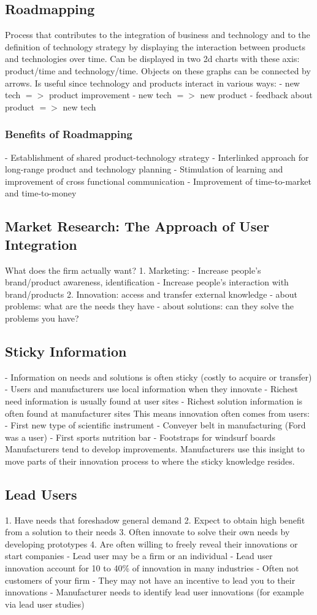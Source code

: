 \documentclass{scrartcl}
\begin{document}
\subsection*{Roadmapping}
Process that contributes to the integration of business and technology and to the definition of technology strategy by displaying the interaction between products and technologies over time.
Can be displayed in two 2d charts with these axis: product/time and technology/time.
Objects on these graphs can be connected by arrows.
Is useful since technology and products interact in various ways:
- new tech $=>$ product improvement
- new tech $=>$ new product
- feedback about product $=>$ new tech
\subsubsection*{Benefits of Roadmapping}
- Establishment of shared product-technology strategy
- Interlinked approach for long-range product and technology planning
- Stimulation of learning and improvement of cross functional communication
- Improvement of time-to-market and time-to-money
\subsection*{Market Research: The Approach of User Integration}
What does the firm actually want?
1. Marketing:
- Increase people's brand/product awareness, identification
- Increase people's interaction with brand/products
2. Innovation: access and transfer external knowledge
- about problems: what are the needs they have
- about solutions: can they solve the problems you have?
\subsection*{Sticky Information}
- Information on needs and solutions is often sticky (costly to acquire or transfer)
- Users and manufacturers use local information when they innovate
- Richest need information is usually found at user sites
- Richest solution information is often found at manufacturer sites
This means innovation often comes from users:
- First new type of scientific instrument
- Conveyer belt in manufacturing (Ford was a user)
- First sports nutrition bar
- Footstraps for windsurf boards
Manufacturers tend to develop improvements. Manufacturers use this insight to move parts of their innovation process to where the sticky knowledge resides.
\subsection*{Lead Users}
1. Have needs that foreshadow general demand
2. Expect to obtain high benefit from a solution to their needs
3. Often innovate to solve their own needs by developing prototypes
4. Are often willing to freely reveal their innovations or start companies
- Lead user may be a firm or an individual
- Lead user innovation account for 10 to 40\% of innovation in many industries
- Often not customers of your firm
- They may not have an incentive to lead you to their innovations
- Manufacturer needs to identify lead user innovations (for example via lead user studies)
\end{document}
